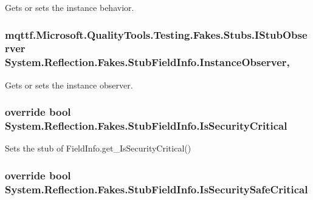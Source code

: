 Gets or sets the instance behavior.

\hypertarget{class_system_1_1_reflection_1_1_fakes_1_1_stub_field_info_aa4e27827b97bc1425b3bf2320a314b49}{
\subsubsection[{Instance\-Observer}]{\setlength{\rightskip}{0pt plus 5cm}mqttf.\-Microsoft.\-Quality\-Tools.\-Testing.\-Fakes.\-Stubs.\-I\-Stub\-Observer System.\-Reflection.\-Fakes.\-Stub\-Field\-Info.\-Instance\-Observer\hspace{0.3cm}{\ttfamily [get]}, {\ttfamily [set]}}}\label{class_system_1_1_reflection_1_1_fakes_1_1_stub_field_info_aa4e27827b97bc1425b3bf2320a314b49}


Gets or sets the instance observer.

\hypertarget{class_system_1_1_reflection_1_1_fakes_1_1_stub_field_info_a1346dbd154ac02c5a16c2ae79fa0320c}{
\subsubsection[{Is\-Security\-Critical}]{\setlength{\rightskip}{0pt plus 5cm}override bool System.\-Reflection.\-Fakes.\-Stub\-Field\-Info.\-Is\-Security\-Critical\hspace{0.3cm}{\ttfamily [get]}}}\label{class_system_1_1_reflection_1_1_fakes_1_1_stub_field_info_a1346dbd154ac02c5a16c2ae79fa0320c}


Sets the stub of Field\-Info.\-get\-\_\-\-Is\-Security\-Critical()

\hypertarget{class_system_1_1_reflection_1_1_fakes_1_1_stub_field_info_a074da3c79e5a57b25aa28ca1ae13b5a8}{
\subsubsection[{Is\-Security\-Safe\-Critical}]{\setlength{\rightskip}{0pt plus 5cm}override bool System.\-Reflection.\-Fakes.\-Stub\-Field\-Info.\-Is\-Security\-Safe\-Critical\hspace{0.3cm}{\ttfamily [get]}}}\label{class_system_1_1_reflection_1_1_fakes_1_1_stub_field_info_a074da3c79e5a57b25aa28ca1ae13b5a8}


